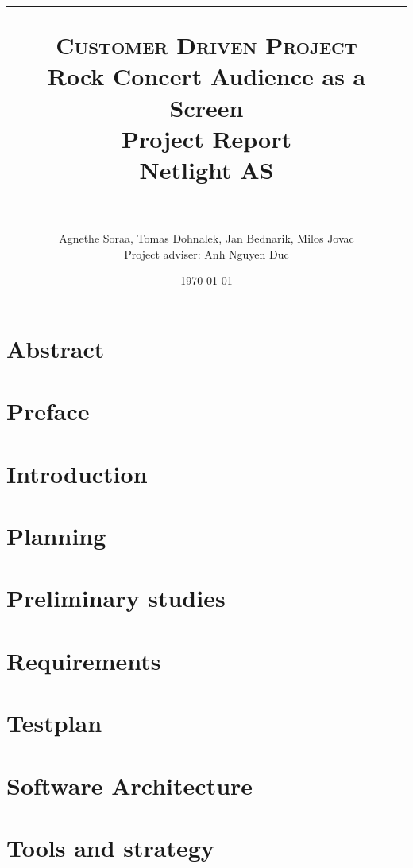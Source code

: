 \documentclass{report}
\title{
	\hrule
    \normalsize \textsc{Customer Driven Project}\\
    \Huge Rock Concert Audience as a Screen\\[10pt]
    \normalsize Project Report\\[10pt]
    Netlight AS
    \hrule
    }
\author{Agnethe Soraa,
Tomas Dohnalek,
Jan Bednarik,
Milos Jovac \\
\normalsize Project adviser: Anh Nguyen Duc}
\date{\today}
\begin{document}
\maketitle
\chapter*{Abstract}


\chapter*{Preface}
%

\tableofcontents
\setcounter{page}{3}

\chapter{Introduction}


\chapter{Planning}


\chapter{Preliminary studies}


\chapter{Requirements}


\chapter{Testplan}


\chapter{Software Architecture}


\chapter{Tools and strategy}

\end{document}
